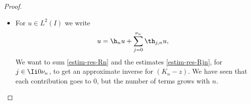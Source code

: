 \begin{proof}
\begin{itemize}
For $j \in \Ii 1 {\nu_n-1}$ we set $\1_j = \1_I$. We also denote by $\1_0$ the operator which maps $u \in L^2(-\ell_-,+\infty)$ to its restriction on $I$, and by $\1_{\nu_n}$ the operator which maps $u \in L^2(-\infty,\ell_+)$ to its restriction to $I$. For $z \in \C_n^-$ we set
\begin{align*}
R_{j,n}(z) &= \1_j \bigl(A_{j,n}-z \bigr)\inv \1_j^*
\\
\tag*{and}
T_{j,n}(z) &= R_{j,n}(z) \theta_{j,n} (K_n-z) - \theta_{j,n}.
\end{align*}
We proceed as above. For $j \in \Ii 0 {\nu_n}$ we have
\begin{equation*}
R_{j,n}(z) \theta_{j,n} (K_n-z)u = \theta_{j,n} u+ i n R_{j,n}(z) \theta_{j,n} r_{j,n} u - R_{j,n}(z) \th_{j,n}'' u + 2 R_{j,n}(z) \partial_y (\th_{j,n}'u),
\end{equation*}
where
\[
r_{j,n}(y) = q^2(y) - q^2(a_{j,n}) - 2\, (y-a_{j,n}) q'(a_{j,n}) q(a_{j,n}).
\]
Let $n \in \N^*$ and $j \in \Ii 0 {\nu_n}$ such that $\theta_{j,n} \neq 0$. Then we have $2n q'(a_{j,n}) \vert q(a_{j,n})\vert \gtrsim n^{1-\rho}$ and hence, for $z \in \C_n^-$ (in particular $\Re(z) \leq \g n^{\sfrac 12} \ll n^{\Psfrac 23(1-\rho)}$), Proposition~\ref{prop-Airy-R+} gives
\begin{equation} \label{estim-res-Ajn}
\nr{R_{j,n}(z)}_{\Lc(L^2(I))} \lesssim n^{-\Psfrac 23(1-\rho)}.
\end{equation}
Then, as above we have $\abs{\tilde r_{j,n}(y) \theta_{j,n}(y)} \lesssim n^{-2\tilde \rho}$ so
\[
n \nr{ R_{j,n}(z) \tilde r_{j,n} \theta_{j,n}}_{\Lc(L^2(I))} \lesssim n^{1-2\tilde \rho - \Psfrac 23(1-\rho)} \limt n {+\infty} 0.
\]
Moreover,
\begin{align*}
\nr{R_{j,n}(z) \th_{j,n}'' u }_{L^2(I)} &\lesssim n^{2\tilde \rho - \Psfrac 23 (1-\rho)} \nr{u}_{L^2(I)},\\
\nr{R_{j,n}(z) (\th'_{j,n} u)'}_{L^2(I)} &\lesssim n^{\tilde \rho - \Psfrac 13(1-\rho)} \nr{u}_{L^2(I)}.
\end{align*}
All these estimates being uniform with respect to $j \in \Ii 0 {\nu_n}$, we finally get
\begin{equation} \label{estim-res-Rjn}
\sup_{z \in \C_n^-} \sup_{0\leq j \leq \nu_n} \nr{T_{j,n}(z)}_{\Lc(L^2(I))} \limt n {+\infty} 0.
\end{equation}

\item
For $u \in L^2(I)$ we write
\[
u = \h_n u + \sum_{j=0}^{\nu_n} \th_{j,n} u,
\]
We want to sum \eqref{estim-res-Rn} and the estimates \eqref{estim-res-Rjn}, for $j \in \Ii 0 {\nu_n}$, to get an approximate inverse for $(K_n-z)$. We have seen that each contribution goes to 0, but the number of terms grows with $n$.


\end{itemize}
\end{proof}
